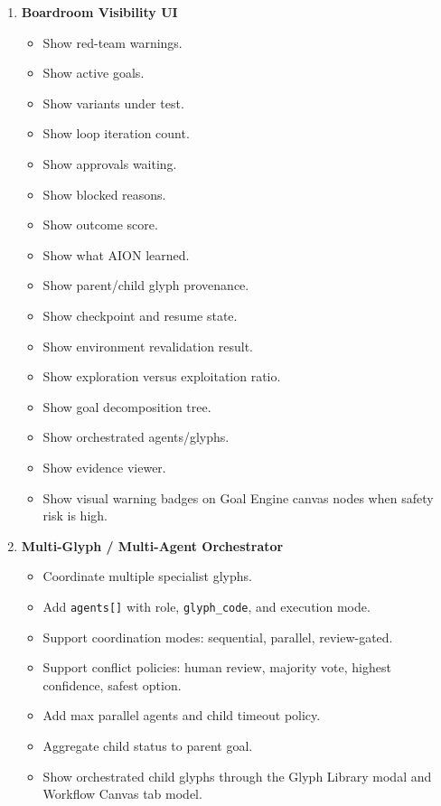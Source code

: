 \begin{enumerate}
  \item \textbf{Boardroom Visibility UI}
  \begin{itemize}
    \item Show red-team warnings.
    \item Show active goals.
    \item Show variants under test.
    \item Show loop iteration count.
    \item Show approvals waiting.
    \item Show blocked reasons.
    \item Show outcome score.
    \item Show what AION learned.
    \item Show parent/child glyph provenance.
    \item Show checkpoint and resume state.
    \item Show environment revalidation result.
    \item Show exploration versus exploitation ratio.
    \item Show goal decomposition tree.
    \item Show orchestrated agents/glyphs.
    \item Show evidence viewer.
    \item Show visual warning badges on Goal Engine canvas nodes when safety risk is high.
  \end{itemize}

  \item \textbf{Multi-Glyph / Multi-Agent Orchestrator}
  \begin{itemize}
    \item Coordinate multiple specialist glyphs.
    \item Add \texttt{agents[]} with role, \texttt{glyph\_code}, and execution mode.
    \item Support coordination modes: sequential, parallel, review-gated.
    \item Support conflict policies: human review, majority vote, highest confidence, safest option.
    \item Add max parallel agents and child timeout policy.
    \item Aggregate child status to parent goal.
    \item Show orchestrated child glyphs through the Glyph Library modal and Workflow Canvas tab model.
  \end{itemize}


\end{enumerate}
